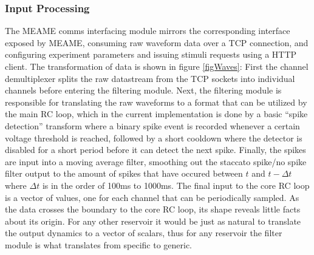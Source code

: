 \subsubsection{Input Processing}
The MEAME comms interfacing module mirrors the corresponding interface exposed
by MEAME, consuming raw waveform data over a TCP connection, and configuring
experiment parameters and issuing stimuli requests using a HTTP client.
The transformation of data is shown in figure \ref{figWaves}:
First the channel demultiplexer splits the raw datastream from the TCP sockets into
individual channels before entering the filtering module.
Next, the filtering module is responsible for translating the raw waveforms to a
format that can be utilized by the main RC loop, which in the current
implementation is done by a basic ``spike detection'' transform where a binary
spike event is recorded whenever a certain voltage threshold is reached,
followed by a short cooldown where the detector is disabled for a short period
before it can detect the next spike. 
Finally, the spikes are input into a moving average filter, smoothing out the
staccato spike/no spike filter output to the amount of spikes that have occured
between $t$ and $t - \Delta t$ where $\Delta t$ is in the order of 100ms to 1000ms.
The final input to the core RC loop is a vector of values, one for each channel
that can be periodically sampled.
As the data crosses the boundary to the core RC loop, its shape reveals little
facts about its origin.
For any other reservoir it would be just as natural to translate the output
dynamics to a vector of scalars, thus for any reservoir the filter module is
what translates from specific to generic.
